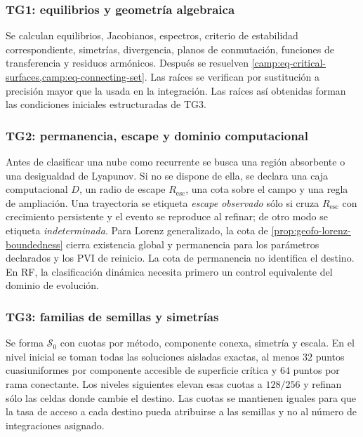 \subsubsection*{TG1: equilibrios y geometría algebraica}

Se calculan equilibrios, Jacobianos, espectros, criterio de estabilidad
correspondiente, simetrías, divergencia, planos de conmutación, funciones de
transferencia y residuos armónicos. Después se resuelven
\cref{camp:eq-critical-surfaces,camp:eq-connecting-set}. Las raíces se
verifican por sustitución a precisión mayor que la usada en la integración.
Las raíces así obtenidas forman las condiciones iniciales estructuradas
de TG3.

\subsubsection*{TG2: permanencia, escape y dominio computacional}

Antes de clasificar una nube como recurrente se busca una región absorbente o
una desigualdad de Lyapunov. Si no se dispone de ella, se declara una caja
computacional \(D\), un radio de escape \(R_{\mathrm{esc}}\), una cota sobre el
campo y una regla de ampliación. Una trayectoria se etiqueta
\emph{escape observado} sólo si cruza \(R_{\mathrm{esc}}\) con crecimiento
persistente y el evento se reproduce al refinar; de otro modo se etiqueta
\emph{indeterminada}. Para Lorenz generalizado, la cota de
\cref{prop:geofo-lorenz-boundedness} cierra existencia global y permanencia
para los parámetros declarados y los PVI de reinicio. La cota de permanencia no identifica el destino. En RF, la clasificación
dinámica necesita primero un control equivalente del dominio de evolución.

\subsubsection*{TG3: familias de semillas y simetrías}

Se forma \(\mathcal S_0\) con cuotas por método, componente conexa, simetría y
escala. En el nivel inicial se toman todas las soluciones aisladas exactas,
al menos \(32\) puntos cuasiuniformes por componente accesible de superficie
crítica y \(64\) puntos por rama conectante. Los niveles siguientes elevan
esas cuotas a \(128/256\) y refinan sólo las celdas donde cambie el destino.
Las cuotas se mantienen iguales para que la tasa de acceso a cada destino
pueda atribuirse a las semillas y no al número de integraciones asignado.

